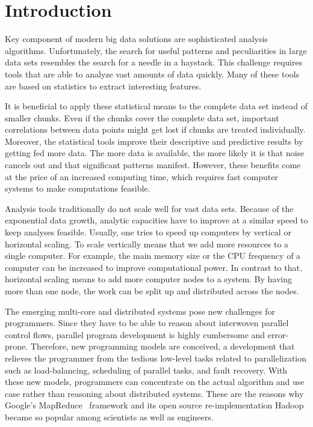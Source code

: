 \section{Introduction}

Key component of modern big data solutions are sophisticated analysis algorithms. 
Unfortunately, the search for useful patterns and peculiarities in large data sets resembles the search for a needle in a haystack. 
This challenge requires tools that are able to analyze vast amounts of data quickly. 
Many of these tools are based on statistics to extract interesting features. 

It is beneficial to apply these statistical means to the complete data set instead of smaller chunks. 
Even if the chunks cover the complete data set, important correlations between data points might get lost if chunks are treated individually. 
Moreover, the statistical tools improve their descriptive and predictive results by getting fed more data. 
The more data is available, the more likely it is that noise cancels out and that significant patterns manifest. 
However, these benefits come at the price of an increased computing time, which requires fast computer systems to make computations feasible. 

Analysis tools traditionally do not scale well for vast data sets.
Because of the exponential data growth, analytic capacities have to improve at a similar speed to keep analyses feasible. 
Usually, one tries to speed up computers by vertical or horizontal scaling.
To scale vertically means that we add more resources to a single computer.
For example, the main memory size or the CPU frequency of a computer can be increased to improve computational power.
In contrast to that, horizontal scaling means to add more computer nodes to a system.
By having more than one node, the work can be split up and distributed across the nodes.

The emerging multi-core and distributed systems pose new challenges for programmers.
Since they have to be able to reason about interwoven parallel control flows, parallel program development is highly cumbersome and error-prone.
Therefore, new programming models are conceived, a development that relieves the programmer from the tedious low-level tasks related to parallelization such as load-balancing, scheduling of parallel tasks, and fault recovery.
With these new models, programmers can concentrate on the actual algorithm and use case rather than reasoning about distributed systems. 
These are the reasons why Google's MapReduce~\cite{dean:c2008a} framework and its open source re-implementation Hadoop~\cite{hadoop:2008a} became so popular among scientists as well as engineers.

